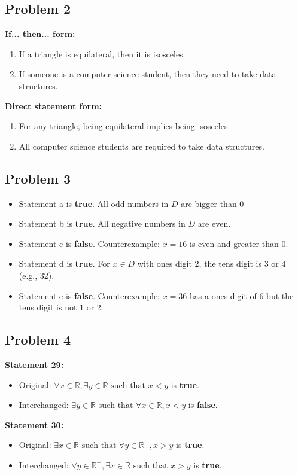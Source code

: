 \documentclass[a4paper, 10pt]{article}
\begin{document}
    \subsection{Problem 2}
    \textbf{If... then... form:}
    \begin{enumerate}
        \item If a triangle is equilateral, then it is isosceles.
        \item If someone is a computer science student, then they need to take data structures.
    \end{enumerate}

    \noindent \textbf{Direct statement form:}
    \begin{enumerate}
        \item For any triangle, being equilateral implies being isosceles.
        \item All computer science students are required to take data structures.
    \end{enumerate}

    \subsection{Problem 3}
    \begin{itemize}
        \item Statement a is \textbf{true}. All odd numbers in \( D \) are bigger than 0
        \item Statement b is \textbf{true}. All negative numbers in \( D \) are even.
        \item Statement c is \textbf{false}. Counterexample: \( x = 16 \) is even and greater than 0.
        \item Statement d is \textbf{true}. For \( x \in D \) with ones digit 2, the tens digit is 3 or 4 (e.g., 32).
        \item Statement e is \textbf{false}. Counterexample: \( x = 36 \) has a ones digit of 6 but the tens digit is not 1 or 2.
    \end{itemize}

    \subsection{Problem 4}
    \textbf{Statement 29:}
    \begin{itemize}
        \item Original: \( \forall x \in \mathbb{R}, \exists y \in \mathbb{R} \text{ such that } x < y \) is \textbf{true}.
        \item Interchanged: \( \exists y \in \mathbb{R} \text{ such that } \forall x \in \mathbb{R}, x < y \) is \textbf{false}.
    \end{itemize}

    \noindent \textbf{Statement 30:}
    \begin{itemize}
        \item Original: \( \exists x \in \mathbb{R} \text{ such that } \forall y \in \mathbb{R^-}, x > y \) is \textbf{true}.
        \item Interchanged: \( \forall y \in \mathbb{R^-}, \exists x \in \mathbb{R} \text{ such that } x > y \) is \textbf{true}.
    \end{itemize}
\end{document}
